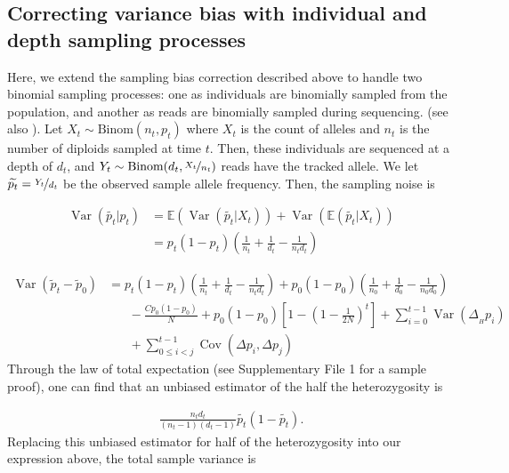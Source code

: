 \documentclass[11pt]{article}
\newcommand{\E}{\mathbb{E}}
\DeclareMathOperator{\var}{Var}
\DeclareMathOperator{\cov}{Cov}
\begin{document}
\subsection{Correcting variance bias with individual and depth sampling processes}
\label{supp:ind-depth-var-corr}

Here, we extend the sampling bias correction described above to handle two
binomial sampling processes: one as individuals are binomially sampled from the
population, and another as reads are binomially sampled during sequencing.
(see also \cite{Jonas2016-ia}). Let $X_t \sim \text{Binom}(n_t, p_t)$ where
$X_t$ is the count of alleles and $n_t$ is the number of diploids sampled at
time $t$. Then, these individuals are sequenced at a depth of $d_t$, and $Y_t
\sim \text{Binom}(d_t, \nicefrac{X_t}{n_t})$ reads have the tracked allele. We
let $\widetilde{p_t} = \nicefrac{Y_t}{d_t}$ be the observed sample allele
frequency. Then, the sampling noise is 

\begin{align}
  \var(\widetilde{p_t}|p_t) &= \E(\var(\widetilde{p_t} | X_t)) + \var(\E(\widetilde{p_t} | X_t)) \\
                            &= p_t(1-p_t) \left(\frac{1}{n_t} + \frac{1}{d_t} - \frac{1}{n_t d_t} \right)
\end{align}


\begin{align}
  \var(\widetilde{p}_t - \widetilde{p}_0) &= 
  p_t(1-p_t) \left(\frac{1}{n_t} + \frac{1}{d_t} - \frac{1}{n_t d_t} \right)  
  + p_0(1-p_0) \left( \frac{1}{n_0} + \frac{1}{d_0} - \frac{1}{n_0 d_0}\right)  \\ & \;\;\;\;\;\;
  - \frac{C p_0(1-p_0)}{N} + p_0(1-p_0) \left[1 - \left(1-\frac{1}{2N}\right)^t \right]+ \sum_{i=0}^{t-1} \var(\Delta_{_H} p_i)  \\ & \;\;\;\;\;\; + \sum_{0 \le i < j}^{t-1} \cov(\Delta p_i, \Delta p_j) 
\end{align}
%
Through the law of total expectation (see \cite{Kolaczkowski2011-ee}
Supplementary File 1 for a sample proof), one can find that an unbiased
estimator of the half the heterozygosity is 

\begin{align}
  \frac{n_t d_t}{(n_t-1) (d_t-1)} \widetilde{p_t}(1-\widetilde{p_t}).
\end{align}
%
Replacing this unbiased estimator for half of the heterozygosity into our
expression above, the total sample variance is
\end{document}
